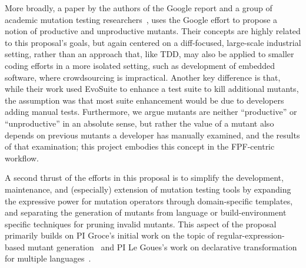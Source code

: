 More broadly, a paper by the
authors of the Google report and a group of academic mutation testing
researchers~\cite{ivankovic2018industrial}, uses the Google effort to
propose a notion of productive and unproductive mutants.  Their
concepts are highly related to this proposal's goals, but again centered on a
diff-focused, large-scale industrial setting, rather than an approach
that, like TDD, may also be applied to smaller coding efforts in a more
isolated setting, such as development of embedded software, where
crowdsourcing is impractical.  Another key difference is that, while their
work used EvoSuite to enhance a test suite to kill additional mutants,
the assumption was that most suite enhancement would be due to
developers adding manual tests.  Furthermore, we argue mutants
are neither ``productive'' or ``unproductive'' in an absolute sense, but
rather the value of a mutant also depends on previous mutants a
developer has manually examined, and the results of that examination;
this project embodies this concept in the FPF-centric workflow.

A second thrust of the efforts in this proposal is to simplify the
development, maintenance, and (especially) extension of mutation
testing tools by
expanding the expressive power for
mutation operators through domain-specific templates, and separating the generation of mutants from
language or build-environment specific techniques for pruning invalid
mutants.  This aspect of the proposal primarily builds on PI Groce's initial work on the topic of
regular-expression-based mutant generation~\cite{regexpMut} and
PI Le Goues's work on declarative transformation for multiple languages~\cite{rvt-ppc}.

